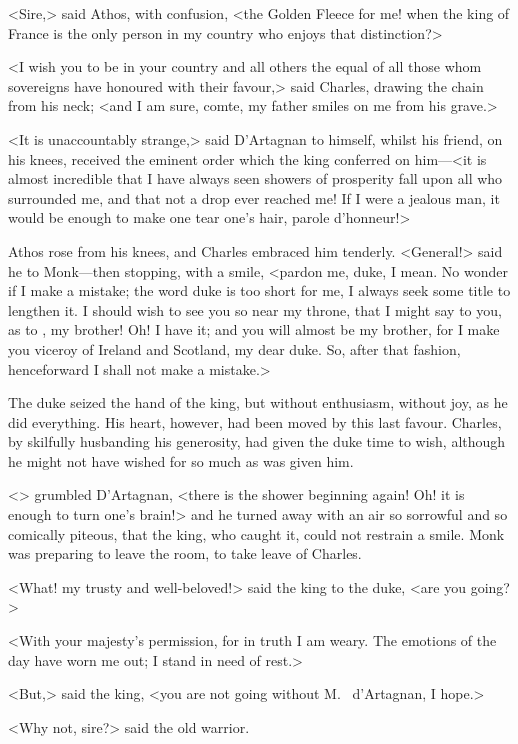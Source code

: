 <Sire,> said Athos, with confusion, <the Golden Fleece for me! when the king of France is the only person in my country who enjoys that distinction?>

<I wish you to be in your country and all others the equal of all those whom sovereigns have honoured with their favour,> said Charles, drawing the chain from his neck; <and I am sure, comte, my father smiles on me from his grave.>

<It is unaccountably strange,> said D'Artagnan to himself, whilst his friend, on his knees, received the eminent order which the king conferred on him—<it is almost incredible that I have always seen showers of prosperity fall upon all who surrounded me, and that not a drop ever reached me! If I were a jealous man, it would be enough to make one tear one's hair, parole d'honneur!>

Athos rose from his knees, and Charles embraced him tenderly. <General!> said he to Monk—then stopping, with a smile, <pardon me, duke, I mean. No wonder if I make a mistake; the word duke is too short for me, I always seek some title to lengthen it. I should wish to see you so near my throne, that I might say to you, as to , my brother! Oh! I have it; and you will almost be my brother, for I make you viceroy of Ireland and Scotland, my dear duke. So, after that fashion, henceforward I shall not make a mistake.>

The duke seized the hand of the king, but without enthusiasm, without joy, as he did everything. His heart, however, had been moved by this last favour. Charles, by skilfully husbanding his generosity, had given the duke time to wish, although he might not have wished for so much as was given him.

<> grumbled D'Artagnan, <there is the shower beginning again! Oh! it is enough to turn one's brain!> and he turned away with an air so sorrowful and so comically piteous, that the king, who caught it, could not restrain a smile. Monk was preparing to leave the room, to take leave of Charles.

<What! my trusty and well-beloved!> said the king to the duke, <are you going?>

<With your majesty's permission, for in truth I am weary. The emotions of the day have worn me out; I stand in need of rest.>

<But,> said the king, <you are not going without M.~ d'Artagnan, I hope.>

<Why not, sire?> said the old warrior.

